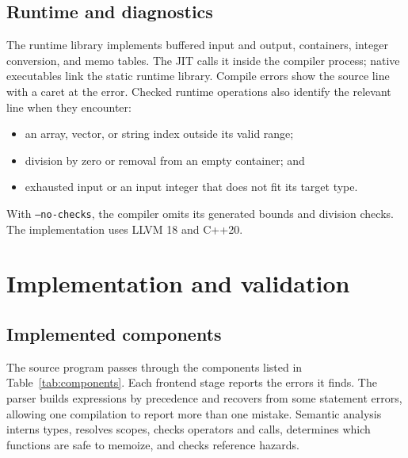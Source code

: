 \documentclass[12pt,a4paper]{report}
\begin{document}
\section{Runtime and diagnostics}
The runtime library implements buffered input and output, containers, integer conversion, and memo tables. The JIT calls it inside the compiler process; native executables link the static runtime library. Compile errors show the source line with a caret at the error. Checked runtime operations also identify the relevant line when they encounter:
\begin{itemize}
\item an array, vector, or string index outside its valid range;
\item division by zero or removal from an empty container; and
\item exhausted input or an input integer that does not fit its target type.
\end{itemize}
With \texttt{--no-checks}, the compiler omits its generated bounds and division checks. The implementation uses LLVM 18 and C++20.

\chapter{Implementation and validation}
\section{Implemented components}
The source program passes through the components listed in Table~\ref{tab:components}. Each frontend stage reports the errors it finds. The parser builds expressions by precedence and recovers from some statement errors, allowing one compilation to report more than one mistake. Semantic analysis interns types, resolves scopes, checks operators and calls, determines which functions are safe to memoize, and checks reference hazards.
\end{document}
